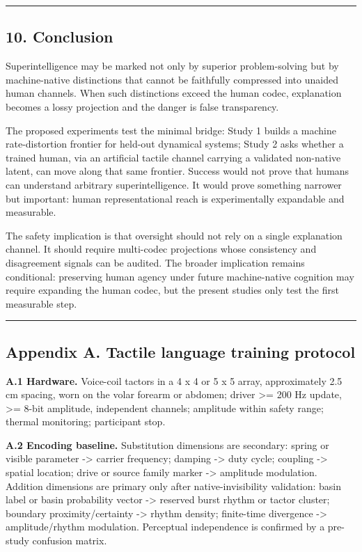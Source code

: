 \documentclass[
  11pt,
]{article}
\begin{document}
\begin{center}\rule{0.5\linewidth}{0.5pt}\end{center}

\subsection{10. Conclusion}\label{conclusion}

Superintelligence may be marked not only by superior
problem-solving but by machine-native distinctions that
cannot be faithfully compressed into unaided human
channels. When such distinctions exceed the human
codec, explanation becomes a lossy projection and the
danger is false transparency.

The proposed experiments test the minimal bridge: Study
1 builds a machine rate-distortion frontier for
held-out dynamical systems; Study 2 asks whether a
trained human, via an artificial tactile channel
carrying a validated non-native latent, can move along
that same frontier. Success would not prove that humans
can understand arbitrary superintelligence. It would
prove something narrower but important: human
representational reach is experimentally expandable and
measurable.

The safety implication is that oversight should not
rely on a single explanation channel. It should require
multi-codec projections whose consistency and
disagreement signals can be audited. The broader
implication remains conditional: preserving human
agency under future machine-native cognition may
require expanding the human codec, but the present
studies only test the first measurable step.

\begin{center}\rule{0.5\linewidth}{0.5pt}\end{center}

\subsection{Appendix A. Tactile language training
protocol}\label{appendix-a.-tactile-language-training-protocol}

\textbf{A.1 Hardware.} Voice-coil tactors in a 4 x 4 or
5 x 5 array, approximately 2.5 cm spacing, worn on the
volar forearm or abdomen; driver \textgreater= 200 Hz
update, \textgreater= 8-bit amplitude, independent
channels; amplitude within safety range; thermal
monitoring; participant stop.

\textbf{A.2 Encoding baseline.} Substitution dimensions
are secondary: spring or visible parameter
-\textgreater{} carrier frequency; damping
-\textgreater{} duty cycle; coupling -\textgreater{}
spatial location; drive or source family marker
-\textgreater{} amplitude modulation. Addition
dimensions are primary only after native-invisibility
validation: basin label or basin probability vector
-\textgreater{} reserved burst rhythm or tactor
cluster; boundary proximity/certainty -\textgreater{}
rhythm density; finite-time divergence -\textgreater{}
amplitude/rhythm modulation. Perceptual independence is
confirmed by a pre-study confusion matrix.
\end{document}
